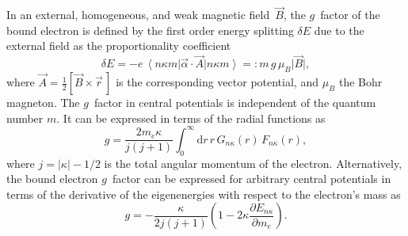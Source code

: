 In an external, homogeneous, and weak magnetic field~$\vec{B}$, the $g$~factor of the bound electron is defined by the first order energy splitting $\delta E$ due to the external field as the proportionality coefficient \cite{Beier2000}
\begin{equation}
\delta E=-e \,\left< n\kappa m \right|\vec{\alpha}\cdot \vec{A}\left|n\kappa m\right> =:m \, g\,  \mu_B {|}{\vec{B}}{|},
\end{equation}
where $\vec{A}=\frac{1}{2}[\vec{B}\times\vec{r}\,]$ is the corresponding vector potential, and $\mu_B$ the Bohr magneton.
%
The $g$~factor in central potentials is independent of the quantum number $m$. It can be expressed in terms of the radial functions as
\begin{equation}
g=\frac{2m_e \kappa}{j(j+1)} \int_0^\infty \text{d}r\, r\, G_{n \kappa}(r)\,F_{n\kappa}(r),
\label{eq:gfacgs}
\end{equation}
where $j=\left|\kappa\right|-1/2$ is the total angular momentum of the electron. Alternatively, the bound electron $g$~factor can be expressed for arbitrary central potentials in terms of the derivative of the eigenenergies with respect to the electron's mass \cite{Karshenboim2005} as
\begin{equation}
g=-\frac{\kappa}{2j(j+1)}\left( 1-2\kappa\frac{\partial E_{n\kappa}}{\partial m_e} \right).
\label{eq:deriv}
\end{equation}

